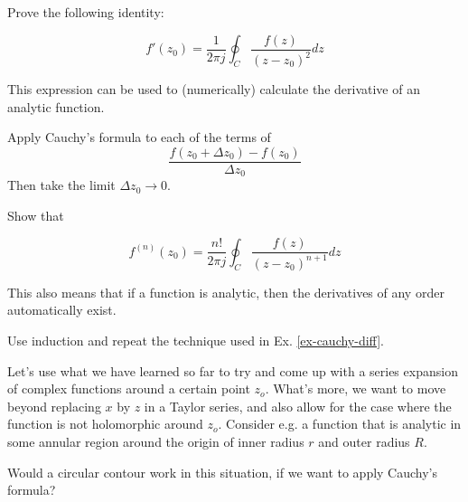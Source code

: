 \begin{exer}
\label{ex-cauchy-diff}
Prove the following identity:

$$f'(z_0)=\frac{1}{2 \pi j} \oint_{{C}} \frac{f(z)} {(z-z_0)^2} dz$$

This expression can be used to (numerically) calculate the derivative of an analytic function.
\begin{hnt}
Apply Cauchy's formula to each of the terms of $$\frac{f(z_0+\Delta z_0) - f(z_0)}{\Delta z_0}$$ Then take the limit ${\Delta z_0} \to 0$.
\end{hnt}
\end{exer}

\begin{exer}
Show that

  $$f^{(n)}(z_0)=\frac{n!}{2 \pi j} \oint_{{C}} \frac{f(z)} {(z-z_0)^{n+1}} dz$$
  
This also means that if a function is analytic, then the derivatives of any order automatically exist.
\begin{hnt}
Use induction and repeat the technique used in Ex. \ref{ex-cauchy-diff}.
\end{hnt}  
\end{exer}


\pagebreak




Let's use what we have learned so far to try and come up with a series expansion of complex functions around a certain point $z_o$. What's more, we want to move beyond replacing $x$ by $z$ in a Taylor series, and also allow for the case where the function is not holomorphic around $z_o$. Consider e.g. a function that is analytic in some annular region around the origin of inner radius $r$ and outer radius $R$.

\begin{cue}
Would a circular contour work in this situation, if we want to apply Cauchy's formula?
\end{cue}

